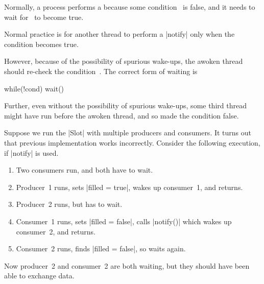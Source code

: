 
\begin{slide}

Normally, a process performs a  because some condition~
is false, and it needs to wait for~ to become true.  

Normal practice is for another thread to perform a |notify| only when the
condition becomes true.

However, because of the possibility of spurious wake-ups, the awoken thread
should re-check the  condition~.  The correct form of waiting is
%
\begin{scala}
  while(!cond) wait()
\end{scala}

Further, even without the possibility of spurious wake-ups, some third thread
might have run before the awoken thread, and so made the condition false. 

\end{slide}


\begin{slide}

Suppose we run the |Slot| with multiple producers and consumers.  It turns out
that previous implementation works incorrectly.
%
Consider the following execution, if |notify| is used.
%
\begin{enumerate}
\item Two consumers run, and both have to wait.

\item Producer~1 runs, sets |filled = true|, wakes up consumer~1, and returns.

\item Producer~2 runs, but has to wait.

\item Consumer~1 runs, sets |filled = false|, calls |notify()| which wakes up
consumer~2, and returns.

\item Consumer~2 runs, finds |filled = false|, so waits again. 
\end{enumerate}
%
Now producer~2 and consumer~2 are both waiting, but they should have been able
to exchange data. 

\end{slide}

